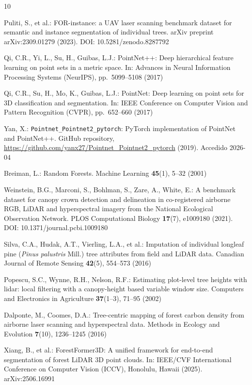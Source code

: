 \documentclass[runningheads]{llncs}
\begin{document}
\begin{thebibliography}{10}

Puliti, S., et al.:
FOR-instance: a UAV laser scanning benchmark dataset for semantic and instance segmentation of individual trees.
arXiv preprint arXiv:2309.01279 (2023).
DOI: 10.5281/zenodo.8287792

Qi, C.R., Yi, L., Su, H., Guibas, L.J.:
PointNet++: Deep hierarchical feature learning on point sets in a metric space.
In: Advances in Neural Information Processing Systems (NeurIPS), pp.~5099--5108 (2017)

Qi, C.R., Su, H., Mo, K., Guibas, L.J.:
PointNet: Deep learning on point sets for 3D classification and segmentation.
In: IEEE Conference on Computer Vision and Pattern Recognition (CVPR), pp.~652--660 (2017)

Yan, X.:
\texttt{Pointnet\_Pointnet2\_pytorch}: PyTorch implementation of PointNet and PointNet++.
GitHub repository, \url{https://github.com/yanx27/Pointnet_Pointnet2_pytorch} (2019). Accedido 2026-04

Breiman, L.:
Random Forests.
Machine Learning \textbf{45}(1), 5--32 (2001)

Weinstein, B.G., Marconi, S., Bohlman, S., Zare, A., White, E.:
A benchmark dataset for canopy crown detection and delineation in co-registered airborne RGB, LiDAR and hyperspectral imagery from the National Ecological Observation Network.
PLOS Computational Biology \textbf{17}(7), e1009180 (2021).
DOI: 10.1371/journal.pcbi.1009180

Silva, C.A., Hudak, A.T., Vierling, L.A., et al.:
Imputation of individual longleaf pine (\emph{Pinus palustris} Mill.) tree attributes from field and LiDAR data.
Canadian Journal of Remote Sensing \textbf{42}(5), 554--573 (2016)

Popescu, S.C., Wynne, R.H., Nelson, R.F.:
Estimating plot-level tree heights with lidar: local filtering with a canopy-height based variable window size.
Computers and Electronics in Agriculture \textbf{37}(1--3), 71--95 (2002)

Dalponte, M., Coomes, D.A.:
Tree-centric mapping of forest carbon density from airborne laser scanning and hyperspectral data.
Methods in Ecology and Evolution \textbf{7}(10), 1236--1245 (2016)

Xiang, B., et al.:
ForestFormer3D: A unified framework for end-to-end segmentation of forest LiDAR 3D point clouds.
In: IEEE/CVF International Conference on Computer Vision (ICCV), Honolulu, Hawaii (2025).
arXiv:2506.16991


\end{thebibliography}
\end{document}
